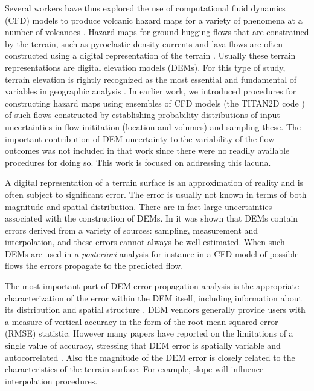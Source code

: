 \documentclass[12pt]{article}
\begin{document}
Several workers have thus explored the use of computational fluid
dynamics (CFD) models to produce volcanic hazard maps for a variety of
phenomena at a number of volcanoes \citep{murcia_2010, Proctor2010, Sheridan2010}.  Hazard maps for ground-hugging flows that are
constrained by the terrain, such as pyroclastic density currents and
lava flows are often constructed using a digital representation of the
terrain \citep{Takahashi2000, Keith}.  Usually these terrain
representations are digital elevation models (DEMs).  For this type of
study, terrain elevation is rightly recognized as the most essential
and fundamental of variables in geographic analysis
\citep{Atkinson2002}. In earlier work, \citep{Keith} we introduced
procedures for constructing hazard maps using ensembles of CFD models
(the TITAN2D code \citep{Patra2005}) of such flows constructed by
establishing probability distributions of input uncertainties in flow
inititation (location and volumes) and sampling these.  The important
contribution of DEM uncertainty to the variability of the flow
outcomes was not included in that work since there were no readily
available procedures for doing so. This work is focused on addressing
this lacuna.


A digital representation of a terrain surface is an approximation of
reality and is often subject to significant error. The error is
usually not known in terms of both magnitude and spatial distribution.
There are in fact large uncertainties associated with the construction
of DEMs. In \citep{Wechsler2006} it was shown that DEMs contain errors
derived from a variety of sources: sampling, measurement and
interpolation, and these errors cannot always be well estimated. When
such DEMs are used in {\it a posteriori} analysis for instance in a
CFD model of possible flows the errors propagate to the predicted
flow.

The most important part of DEM error propagation analysis is the
appropriate characterization of the error within the DEM itself,
including information about its distribution and spatial structure
\citep{Shortridge2001}.  DEM vendors generally provide users with a
measure of vertical accuracy in the form of the root mean squared
error (RMSE) statistic. However many papers have reported on the
limitations of a single value of accuracy, stressing that DEM error is
spatially variable and autocorrelated \citep{Wechsler2006,
  Amii_Darnell}. Also the magnitude of the DEM error is closely
related to the characteristics of the terrain surface. For example,
slope will influence interpolation procedures.
\end{document}
